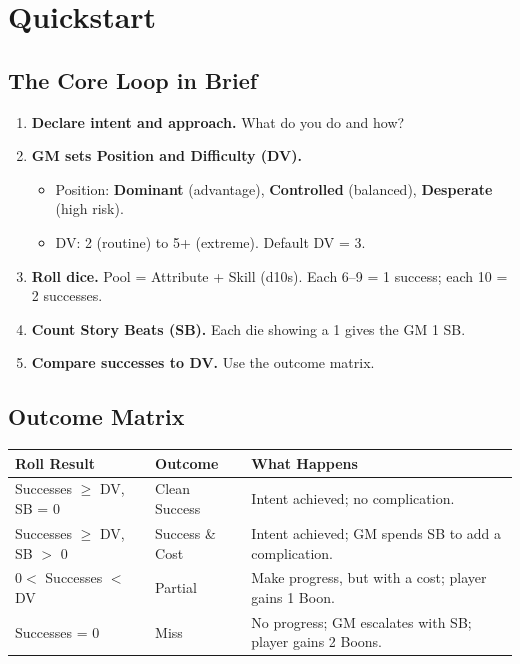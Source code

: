 
\section*{Quickstart}

\subsection*{The Core Loop in Brief}

\begin{enumerate}
  \item \textbf{Declare intent and approach.} What do you do and how?
  \item \textbf{GM sets Position and Difficulty (DV).}
  \begin{itemize}
    \item Position: \textbf{Dominant} (advantage), \textbf{Controlled} (balanced), \textbf{Desperate} (high risk).
    \item DV: 2 (routine) to 5+ (extreme). Default DV = 3.
  \end{itemize}
  \item \textbf{Roll dice.} Pool = Attribute + Skill (d10s). Each 6–9 = 1 success; each 10 = 2 successes.
  \item \textbf{Count Story Beats (SB).} Each die showing a 1 gives the GM 1 SB.
  \item \textbf{Compare successes to DV.} Use the outcome matrix.
\end{enumerate}

\subsection*{Outcome Matrix}

\begin{tabular}{@{}llp{6cm}@{}}
\toprule
\textbf{Roll Result} & \textbf{Outcome} & \textbf{What Happens} \\
\midrule
Successes $\ge$ DV, SB = 0 & Clean Success & Intent achieved; no complication. \\
Successes $\ge$ DV, SB $>$ 0 & Success \& Cost & Intent achieved; GM spends SB to add a complication. \\
$0 <$ Successes $<$ DV & Partial & Make progress, but with a cost; player gains 1 Boon. \\
Successes = 0 & Miss & No progress; GM escalates with SB; player gains 2 Boons. \\
\bottomrule
\end{tabular}

